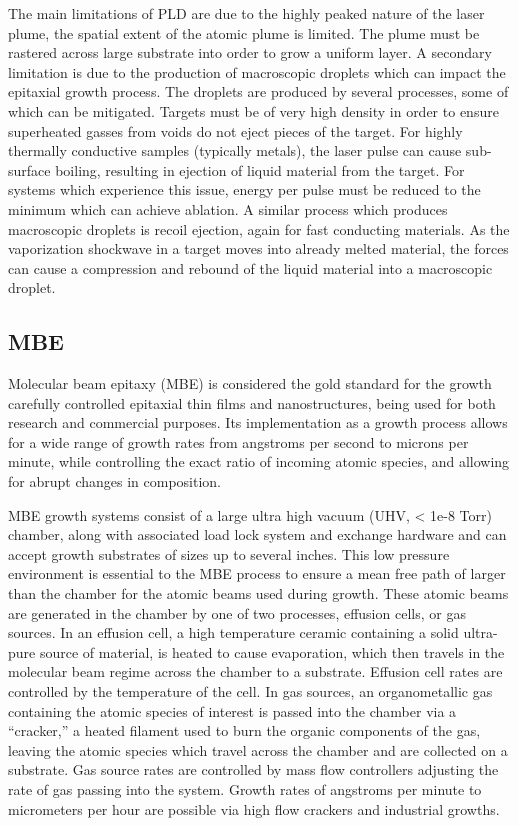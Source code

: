 The main limitations of PLD are due to the highly peaked nature of the laser plume, the spatial extent of the atomic plume is limited.
The plume must be rastered across large substrate into order to grow a uniform layer.
A secondary limitation is due to the production of macroscopic droplets which can impact the epitaxial growth process.
The droplets are produced by several processes, some of which can be mitigated.
Targets must be of very high density in order to ensure superheated gasses from voids do not eject pieces of the target.
For highly thermally conductive samples (typically metals), the laser pulse can cause sub-surface boiling, resulting in ejection of liquid material from the target.
For systems which experience this issue, energy per pulse must be reduced to the minimum which can achieve ablation.
A similar process which produces macroscopic droplets is recoil ejection, again for fast conducting materials.
As the vaporization shockwave in a target moves into already melted material, the forces can cause a compression and rebound of the liquid material into a macroscopic droplet.

\subsection{MBE} Molecular beam epitaxy (MBE) is considered the gold standard for the growth carefully controlled epitaxial thin films and nanostructures, being used for both research and commercial purposes.
Its implementation as a growth process allows for a wide range of growth rates from angstroms per second to microns per minute, while controlling the exact ratio of incoming atomic species, and allowing for abrupt changes in composition.

MBE growth systems consist of a large ultra high vacuum (UHV, < 1e-8 Torr) chamber, along with associated load lock system and exchange hardware and can accept growth substrates of sizes up to several inches.
This low pressure environment is essential to the MBE process to ensure a mean free path of larger than the chamber for the atomic beams used during growth.
These atomic beams are generated in the chamber by one of two processes, effusion cells, or gas sources.
In an effusion cell, a high temperature ceramic containing a solid ultra-pure source of material, is heated to cause evaporation, which then travels in the molecular beam regime across the chamber to a substrate.
Effusion cell rates are controlled by the temperature of the cell.
In gas sources, an organometallic gas containing the atomic species of interest is passed into the chamber via a ``cracker,'' a heated filament used to burn the organic components of the gas, leaving the atomic species which travel across the chamber and are collected on a substrate.
Gas source rates are controlled by mass flow controllers adjusting the rate of gas passing into the system.
Growth rates of angstroms per minute to micrometers per hour are possible via high flow crackers and industrial growths.

